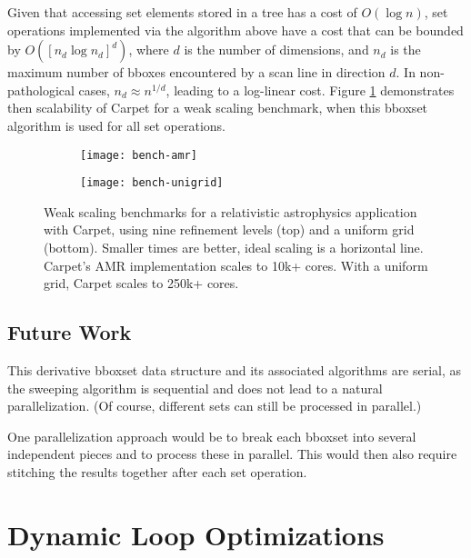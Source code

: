 \documentclass[conference]{IEEEtran}
\begin{document}
Given that accessing set elements stored in a tree has a cost of
$O(\log n)$, set operations implemented via the algorithm above have a
cost that can be bounded by $O([n_d \log n_d]^d)$, where $d$ is the
number of dimensions, and $n_d$ is the maximum number of bboxes
encountered by a scan line in direction $d$. In non-pathological
cases, $n_d \approx n^{1/d}$, leading to a log-linear cost. Figure
\ref{fig:bench} demonstrates then scalability of Carpet for a weak
scaling benchmark, when this bboxset algorithm is used for all set
operations.

\begin{figure}
  \centering
  \begin{subfigure}{\linewidth}
    \centering
    \vspace{-0.7cm}
    \texttt{[image: bench-amr]}
    \vspace{-1.4cm}
  \end{subfigure}
  \begin{subfigure}{\linewidth}
    \centering
    \vspace{-0.7cm}
    \texttt{[image: bench-unigrid]}
    \vspace{-1.3cm}
  \end{subfigure}
  \caption{Weak scaling benchmarks for a relativistic astrophysics
    application with Carpet, using nine refinement levels (top) and a
    uniform grid (bottom). Smaller times are better, ideal scaling is
    a horizontal line. Carpet's AMR implementation scales to 10k+
    cores. With a uniform grid, Carpet scales to 250k+ cores.}
  \label{fig:bench}
\end{figure}

\subsection{Future Work}

This derivative bboxset data structure and its
associated algorithms are serial, as the sweeping algorithm is sequential
and does not lead to a natural parallelization. (Of course, different
sets can still be processed in parallel.)

One parallelization approach would be
to break each bboxset into several independent pieces and to process
these in parallel. This would then also require stitching the
results together after each set operation.



\section{Dynamic Loop Optimizations}
\label{sec:loopcontrol}
\end{document}
